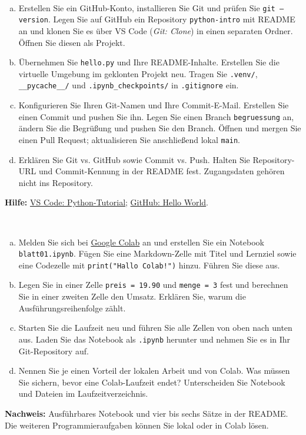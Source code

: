 \\
\begin{enumerate}[a)]
\item Erstellen Sie ein GitHub-Konto, installieren Sie Git und prüfen Sie \texttt{git --version}.
Legen Sie auf GitHub ein Repository \texttt{python-intro} mit README an und klonen Sie es
über VS Code (\emph{Git: Clone}) in einen separaten Ordner. Öffnen Sie diesen als Projekt.
\item Übernehmen Sie \texttt{hello.py} und Ihre README-Inhalte. Erstellen Sie die virtuelle
Umgebung im geklonten Projekt neu. Tragen Sie \texttt{.venv/}, \texttt{\_\_pycache\_\_/}
und \texttt{.ipynb\_checkpoints/} in \texttt{.gitignore} ein.
\item Konfigurieren Sie Ihren Git-Namen und Ihre Commit-E-Mail. Erstellen Sie einen Commit
und pushen Sie ihn. Legen Sie einen Branch \texttt{begruessung} an, ändern Sie die Begrüßung und pushen Sie den Branch.
Öffnen und mergen Sie einen Pull Request; aktualisieren Sie anschließend lokal \texttt{main}.
\item Erklären Sie Git vs. GitHub sowie Commit vs. Push. Halten Sie Repository-URL und
Commit-Kennung in der README fest. Zugangsdaten gehören nicht ins Repository.
\end{enumerate}
\textbf{Hilfe:} \href{https://code.visualstudio.com/docs/python/python-tutorial}{VS Code: Python-Tutorial};
\href{https://docs.github.com/en/get-started/using-github/hello-world}{GitHub: Hello World}.

\newpage
{}\\
\begin{enumerate}[a)]
\item Melden Sie sich bei \href{https://colab.research.google.com/}{Google Colab} an und erstellen
Sie ein Notebook \texttt{blatt01.ipynb}. Fügen Sie eine Markdown-Zelle mit Titel und Lernziel
sowie eine Codezelle mit \texttt{print("Hallo Colab!")} hinzu. Führen Sie diese aus.
\item Legen Sie in einer Zelle \texttt{preis = 19.90} und \texttt{menge = 3} fest und berechnen
Sie in einer zweiten Zelle den Umsatz. Erklären Sie, warum die Ausführungsreihenfolge zählt.
\item Starten Sie die Laufzeit neu und führen Sie alle Zellen von oben nach unten aus.
Laden Sie das Notebook als \texttt{.ipynb} herunter und nehmen Sie es in Ihr Git-Repository auf.
\item Nennen Sie je einen Vorteil der lokalen Arbeit und von Colab. Was müssen Sie sichern,
bevor eine Colab-Laufzeit endet? Unterscheiden Sie Notebook und Dateien im Laufzeitverzeichnis.
\end{enumerate}
\textbf{Nachweis:} Ausführbares Notebook und vier bis sechs Sätze in der README.
Die weiteren Programmieraufgaben können Sie lokal oder in Colab lösen.

